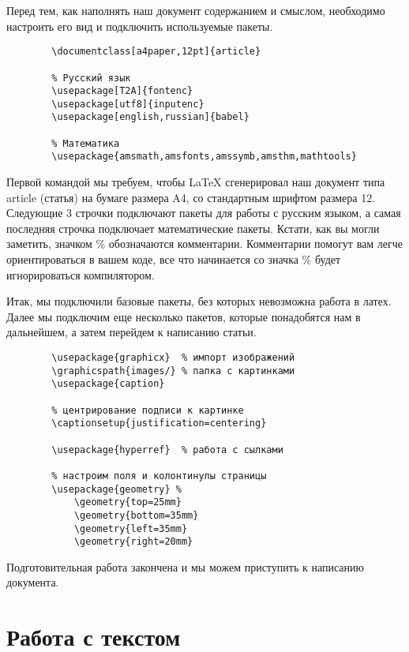     Перед тем, как наполнять наш документ содержанием и смыслом, необходимо настроить его вид и подключить используемые пакеты.

    \begin{verbatim}
        \documentclass[a4paper,12pt]{article}

        % Русский язык
        \usepackage[T2A]{fontenc}
        \usepackage[utf8]{inputenc}	
        \usepackage[english,russian]{babel}

        % Математика
        \usepackage{amsmath,amsfonts,amssymb,amsthm,mathtools} 
    \end{verbatim}

    Первой командой мы требуем, чтобы \LaTeX{} сгенерировал наш документ типа article (статья) на бумаге размера A4, со стандартным шрифтом размера 12.
    Следующие 3 строчки подключают пакеты для работы с русским языком, а самая последняя строчка подключает математические пакеты.
    Кстати, как вы могли заметить, значком \% обозначаются комментарии. Комментарии помогут вам легче ориентироваться в вашем коде,
    все что начинается со значка \% будет игнорироваться компилятором.
    
    Итак, мы подключили базовые пакеты, без которых невозможна работа в латех. Далее мы подключим еще
    несколько пакетов, которые понадобятся нам в дальнейшем, а затем перейдем к написанию статьи.

    \begin{verbatim}
        \usepackage{graphicx}  % импорт изображений
        \graphicspath{images/} % папка с картинками
        \usepackage{caption}

        % центрирование подписи к картинке
        \captionsetup{justification=centering}

        \usepackage{hyperref}  % работа с сылками

        % настроим поля и колонтинулы страницы
        \usepackage{geometry} %
            \geometry{top=25mm}
            \geometry{bottom=35mm}
            \geometry{left=35mm}
            \geometry{right=20mm}
    \end{verbatim}

    Подготовительная работа закончена и мы можем приступить к написанию документа.


    \section{Работа с текстом}

